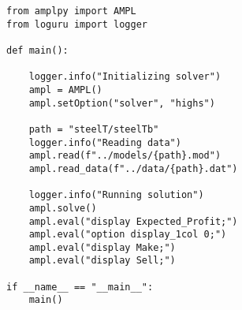 \begin{verbatim}
from amplpy import AMPL
from loguru import logger

def main():

    logger.info("Initializing solver")
    ampl = AMPL()
    ampl.setOption("solver", "highs")

    path = "steelT/steelTb"
    logger.info("Reading data")
    ampl.read(f"../models/{path}.mod")
    ampl.read_data(f"../data/{path}.dat")

    logger.info("Running solution")
    ampl.solve()
    ampl.eval("display Expected_Profit;")
    ampl.eval("option display_1col 0;")
    ampl.eval("display Make;")
    ampl.eval("display Sell;")

if __name__ == "__main__":
    main()
\end{verbatim}
